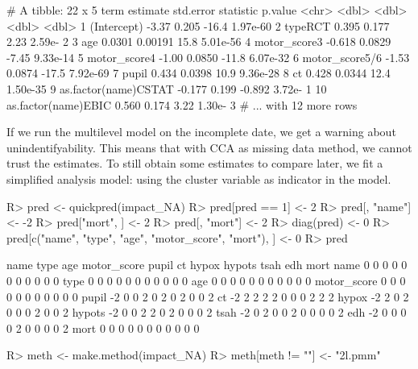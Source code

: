 \documentclass[
]{jss}
\begin{document}
\begin{CodeChunk}
\begin{CodeOutput}
# A tibble: 22 x 5
   term                 estimate std.error statistic  p.value
   <chr>                   <dbl>     <dbl>     <dbl>    <dbl>
 1 (Intercept)           -3.37     0.205     -16.4   1.97e-60
 2 typeRCT                0.395    0.177       2.23  2.59e- 2
 3 age                    0.0301   0.00191    15.8   5.01e-56
 4 motor_score3          -0.618    0.0829     -7.45  9.33e-14
 5 motor_score4          -1.00     0.0850    -11.8   6.07e-32
 6 motor_score5/6        -1.53     0.0874    -17.5   7.92e-69
 7 pupil                  0.434    0.0398     10.9   9.36e-28
 8 ct                     0.428    0.0344     12.4   1.50e-35
 9 as.factor(name)CSTAT  -0.177    0.199      -0.892 3.72e- 1
10 as.factor(name)EBIC    0.560    0.174       3.22  1.30e- 3
# ... with 12 more rows
\end{CodeOutput}
\end{CodeChunk}

If we run the multilevel model on the incomplete date, we get a warning
about unindentifyability. This means that with CCA as missing data
method, we cannot trust the estimates. To still obtain some estimates to
compare later, we fit a simplified analysis model: using the cluster
variable as indicator in the model.

\begin{CodeChunk}
\begin{CodeInput}
R> pred <- quickpred(impact_NA)
R> pred[pred == 1] <- 2
R> pred[, "name"] <- -2
R> pred["mort", ] <- 2
R> pred[, "mort"] <- 2
R> diag(pred) <- 0
R> pred[c("name", "type", "age", "motor_score", "mort"), ] <- 0
R> pred
\end{CodeInput}
\begin{CodeOutput}
            name type age motor_score pupil ct hypox hypots tsah edh mort
name           0    0   0           0     0  0     0      0    0   0    0
type           0    0   0           0     0  0     0      0    0   0    0
age            0    0   0           0     0  0     0      0    0   0    0
motor_score    0    0   0           0     0  0     0      0    0   0    0
pupil         -2    0   0           2     0  2     0      2    0   0    2
ct            -2    2   2           2     2  0     0      0    2   2    2
hypox         -2    2   0           2     0  0     0      2    0   0    2
hypots        -2    0   0           2     2  0     2      0    0   0    2
tsah          -2    0   2           0     0  2     0      0    0   0    2
edh           -2    0   0           0     0  2     0      0    0   0    2
mort           0    0   0           0     0  0     0      0    0   0    0
\end{CodeOutput}
\begin{CodeInput}
R> meth <- make.method(impact_NA)
R> meth[meth != ""] <- "2l.pmm"
\end{CodeInput}
\end{CodeChunk}
\end{document}
